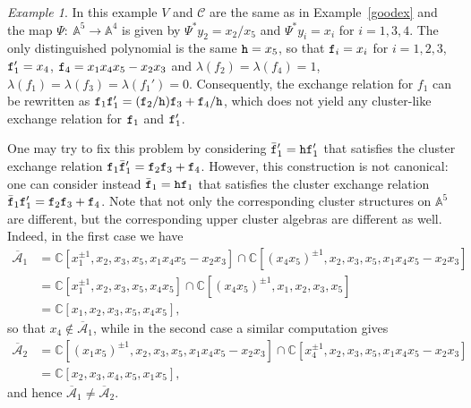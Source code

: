 \documentclass{amsart}
\theoremstyle{definition}
\theoremstyle{remark}
\newtheorem{example}[theorem]{Example}
\numberwithin{equation}{section}
\numberwithin{theorem}{section}
\def\A{{\mathcal A}}
\def\AA{{\mathbb A}}
\def\C{{\mathbb C}}
\def\CC{{\mathcal C}}
\def\UU{\overline{\A}}
\def\ttf{{\tt f}}
\def\tth{{\tt h}}
\def\:{{:\ }}
\begin{document}
\begin{example} \label{badex}
In this example $V$ and $\CC$ are the same as in Example~\ref{goodex} and the map $\Psi\:\AA^5\to\AA^4$ is given by
$\Psi^*y_2=x_2/x_5$ and $\Psi^*y_i=x_i$ for $i=1,3,4$. The only distinguished polynomial is the same $\tth=x_5$, so that 
$\ttf_i= x_i$ for $i=1,2,3$, $\ttf_1'=x_4$, $\ttf_4=  x_1x_4x_5-x_2x_3$ and $\lambda(f_2)=\lambda(f_4)=1$, 
$\lambda(f_1)=\lambda(f_3)=\lambda(f_1')=0$. Consequently, the exchange relation for $f_1$ 
can be rewritten as $\ttf_1 \ttf_1'=(\ttf_2/\tth) \ttf_3 + \ttf_4/\tth$, which does not yield any cluster-like exchange relation for $\ttf_1$ and $\ttf_1'$.

One may try to fix this problem by considering $\bar \ttf_1'=\tth \ttf_1'$ that satisfies the cluster exchange relation 
$ \ttf_1\bar \ttf_1'= \ttf_2\ttf_3 +\ttf_4$. However, this construction is not canonical: one can consider instead 
$\bar \ttf_1=\tth\ttf_1$ that satisfies the cluster exchange relation $\bar \ttf_1 \ttf_1'= \ttf_2 \ttf_3 + \ttf_4$. Note that not only the corresponding cluster structures on $\AA^5$ are different, but the corresponding upper cluster algebras are different as well. Indeed, in the first case we have 
\begin{equation*}
\begin{aligned}
\UU_1&=\C[x_1^{\pm1},x_2,x_3,x_5,x_1x_4x_5-x_2x_3]\cap\C[(x_4x_5)^{\pm1},x_2,x_3,x_5,x_1x_4x_5-x_2x_3]\\
&=\C[x_1^{\pm1},x_2,x_3,x_5,x_4x_5]\cap\C[(x_4x_5)^{\pm1},x_1, x_2,x_3,x_5]\\
&=\C[x_1,x_2,x_3,x_5,x_4x_5],
\end{aligned}
\end{equation*}
so that $x_4\notin\UU_1$, while in the second case a similar computation gives
\begin{equation*}
\begin{aligned}
\UU_2&=\C[(x_1x_5)^{\pm1},x_2,x_3,x_5,x_1x_4x_5-x_2x_3]\cap\C[x_4^{\pm1},x_2,x_3,x_5,x_1x_4x_5-x_2x_3]\\
&=\C[x_2,x_3,x_4,x_5,x_1x_5],
\end{aligned}
\end{equation*}
and hence $\UU_1\ne\UU_2$.
 \end{example}
\end{document}
